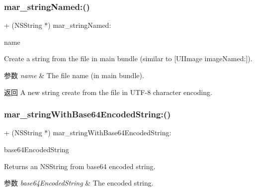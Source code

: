 \subsubsection{\texorpdfstring{mar\+\_\+string\+Named\+:()}{mar\_stringNamed:()}}
{\footnotesize\ttfamily + (N\+S\+String $\ast$) mar\+\_\+string\+Named\+: \begin{DoxyParamCaption}\item[{(N\+S\+String $\ast$)}]{name }\end{DoxyParamCaption}}

Create a string from the file in main bundle (similar to \mbox{[}U\+I\+Image image\+Named\+:\mbox{]}).


\begin{DoxyParams}{参数}
{\em name} & The file name (in main bundle).\\
\hline
\end{DoxyParams}
\begin{DoxyReturn}{返回}
A new string create from the file in U\+T\+F-\/8 character encoding. 
\end{DoxyReturn}
\mbox{\label{category_n_s_string_07_m_a_r_e_x_08_a2b59c6a57a5d14dbf9ac0f9d7b148e5c}} 
\subsubsection{\texorpdfstring{mar\+\_\+string\+With\+Base64\+Encoded\+String\+:()}{mar\_stringWithBase64EncodedString:()}}
{\footnotesize\ttfamily + (N\+S\+String $\ast$) mar\+\_\+string\+With\+Base64\+Encoded\+String\+: \begin{DoxyParamCaption}\item[{(N\+S\+String $\ast$)}]{base64\+Encoded\+String }\end{DoxyParamCaption}}

Returns an N\+S\+String from base64 encoded string. 
\begin{DoxyParams}{参数}
{\em base64\+Encoded\+String} & The encoded string. \\
\hline
\end{DoxyParams}
\mbox{\label{category_n_s_string_07_m_a_r_e_x_08_abeac9eec14bc50383c6c0f62d8851d13}} 
